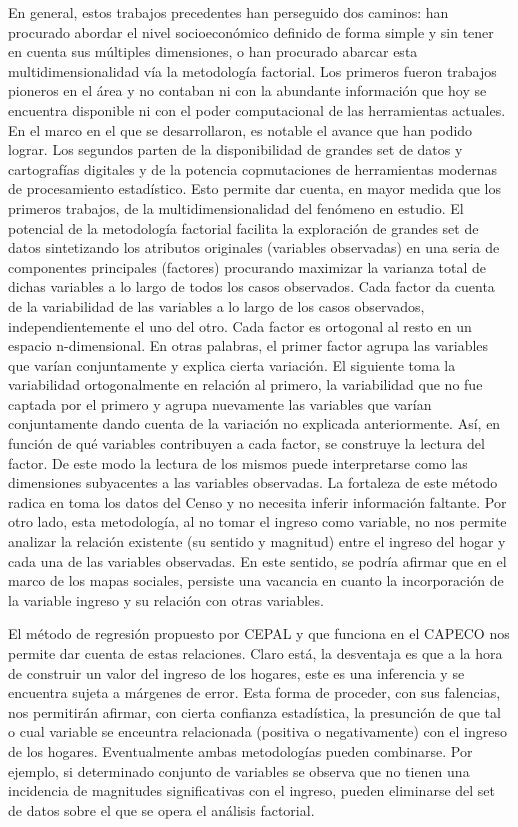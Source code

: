 En general, estos trabajos precedentes han perseguido dos caminos: han procurado abordar el nivel socioeconómico definido de forma simple y sin tener en cuenta sus múltiples dimensiones, o han procurado abarcar esta multidimensionalidad vía la metodología factorial. Los primeros fueron trabajos pioneros en el área y no contaban ni con la abundante información que hoy se encuentra disponible ni con el poder computacional de las herramientas actuales. En el marco en el que se desarrollaron, es notable el avance que han podido lograr. Los segundos parten de la disponibilidad de grandes set de datos y cartografías digitales y de la potencia copmutaciones de herramientas modernas de procesamiento estadístico. Esto permite dar cuenta, en mayor medida que los primeros trabajos, de la multidimensionalidad del fenómeno en estudio. El potencial de la metodología factorial facilita la exploración de grandes set de datos sintetizando los atributos originales (variables observadas) en una seria de componentes principales (factores) procurando maximizar la varianza total de dichas variables a lo largo de todos los casos observados. Cada factor da cuenta de la variabilidad de las variables a lo largo de los casos observados, independientemente el uno del otro. Cada factor es ortogonal al resto en un espacio n-dimensional.  En otras palabras, el primer factor agrupa las variables que varían conjuntamente y explica cierta variación. El siguiente toma la variabilidad ortogonalmente en relación al primero, la variabilidad que no fue captada por el primero y agrupa nuevamente las variables que varían conjuntamente dando cuenta de la variación no explicada anteriormente. Así, en función de qué variables contribuyen a cada factor, se construye la lectura del factor. De este modo la lectura de los mismos puede interpretarse  como las dimensiones subyacentes a las variables observadas. La fortaleza de este método radica en toma los datos del Censo y no necesita inferir información faltante. Por otro lado, esta metodología, al no tomar el ingreso como variable, no nos permite analizar la relación existente (su sentido y magnitud) entre el ingreso del hogar y cada una de las variables observadas. En este sentido, se podría afirmar que en el marco de los mapas sociales, persiste una vacancia en cuanto la incorporación de la variable ingreso y su relación con otras variables.

El método de regresión propuesto por CEPAL y que funciona en el CAPECO nos permite dar cuenta de estas relaciones. Claro está, la desventaja es que a la hora de construir un valor del ingreso de los hogares, este es una inferencia y se encuentra sujeta a márgenes de error. Esta forma de proceder, con sus falencias, nos permitirán afirmar, con cierta confianza estadística, la presunción de que tal o cual variable se enceuntra relacionada (positiva o negativamente) con el ingreso de los hogares. Eventualmente ambas metodologías pueden combinarse. Por ejemplo, si determinado conjunto de variables se observa que no tienen una incidencia de magnitudes significativas con el ingreso, pueden eliminarse del set de datos sobre el que se opera el análisis factorial. 


